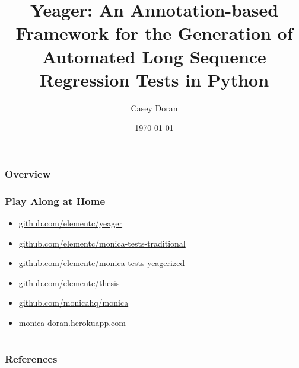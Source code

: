 \documentclass{beamer}
\title[Yeager]{Yeager: An Annotation-based Framework for the Generation of Automated Long Sequence Regression Tests in Python}
\author{Casey Doran}
\institute[Florida Tech]
{
Florida Institute of Technology \\
\medskip
\textit{cdoran2011@my.fit.edu}
}
\date{\today}
\begin{document}
\begin{frame}
\titlepage
\end{frame}

\begin{frame}
\frametitle{Overview}
\tableofcontents
\end{frame}

\begin{frame}
  \frametitle{Play Along at Home}
  \begin{itemize}
    \item \url{github.com/elementc/yeager}
    \item \url{github.com/elementc/monica-tests-traditional}
    \item \url{github.com/elementc/monica-tests-yeagerized}
    \item \url{github.com/elementc/thesis}
    \item \url{github.com/monicahq/monica}
    \item \url{monica-doran.herokuapp.com}
  \end{itemize}
\end{frame}





\section{} %

\begin{frame}[t, allowframebreaks]
\frametitle{References}


\end{frame}
\end{document}
